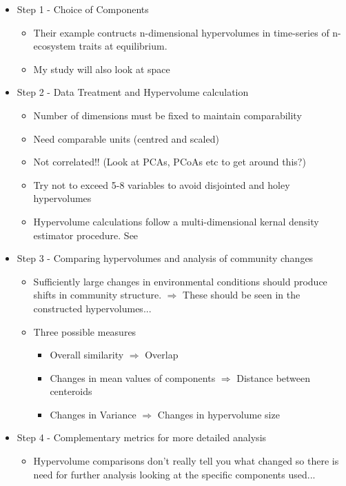 \documentclass[11pt]{article}
\begin{document}
		\begin{itemize}
			\item Step 1 - Choice of Components
			\begin{itemize}
				\item Their example contructs n-dimensional hypervolumes in time-series of n-ecosystem traits at equilibrium.
				\item My study will also look at space
			\end{itemize}
			
			\item Step 2 - Data Treatment and Hypervolume calculation
			\begin{itemize}
				\item Number of dimensions must be fixed to maintain comparability
				\item Need comparable units (centred and scaled)
				\item Not correlated!! (Look at PCAs, PCoAs etc to get around this?)
				\item Try not to exceed 5-8 variables to avoid disjointed and holey hypervolumes
				\item Hypervolume calculations follow a multi-dimensional kernal density estimator procedure. See \cite{Blonder2014}   
			\end{itemize}
			
			\item Step 3 - Comparing hypervolumes and analysis of community changes
			\begin{itemize}
				\item Sufficiently large changes in environmental conditions should produce shifts in community structure. $\Rightarrow$ These should be seen in the constructed hypervolumes...
				\item Three possible measures
				\begin{itemize}
					\item Overall similarity $\Rightarrow$ Overlap
					\item Changes in mean values of components $\Rightarrow$ Distance between centeroids
					\item Changes in Variance $\Rightarrow$ Changes in hypervolume size 
				\end{itemize}
			\end{itemize}
			
			\item Step 4 - Complementary metrics for more detailed analysis
			\begin{itemize}
				\item Hypervolume comparisons don't really tell you what changed so there is  need for further analysis looking at the specific components used...
			\end{itemize}
		 

\end{itemize}
\end{document}
